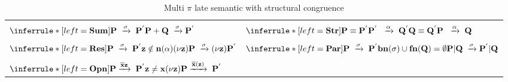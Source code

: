 \begin{definition}
\begin{table}
\begin{tabular}{ll}
      \\\\
	  $\inferrule* [left=\bf{Sum}]{
	    P\; \xrightarrow{\sigma}\; P^{'}
	  }{
	    P+Q \;\xrightarrow{\sigma} P^{'}
	  }$
	&
	  $\inferrule* [left=\bf{Str}]{
	      P\equiv P^{'}
	    \\
	      P^{'}\; \;\xrightarrow{\alpha}\; Q^{'}
	    \\
	      Q\equiv Q^{'}
	  }{
	      P\; \;\xrightarrow{\alpha}\; Q
	  }$
      \\\\
	  $\inferrule* [left=\bf{Res}]{
	      P\; \xrightarrow{\sigma}\; P^{'}
	    \\
	      z\notin n(\alpha)
	  }{
	    (\nu z) P \;\xrightarrow{\sigma} (\nu z) P^{'}
	  }$
	&
	  $\inferrule* [left=\bf{Par}]{
	      P\; \xrightarrow{\sigma}\; P^{'}
	    \\
	      bn(\sigma)\cup fn(Q)=\emptyset
	  }{
	    P|Q \;\xrightarrow{\sigma} P^{'}|Q
	  }$
      \\\\
	  $\inferrule* [left=\bf{Opn}]{
	      P \xrightarrow{\overline{x}z}\; P^{'}
	    \\ 
	      z\neq x
	  }{
	      (\nu z)P \xrightarrow{\overline{x}(z)}\; P^{'}
	  }$
	&
      \\\hline
    \end{tabular}
    \caption{Multi $\pi$ late semantic with structural congruence}
    \label{multipisoloinputlateywith}
  \end{table}
\end{definition}

